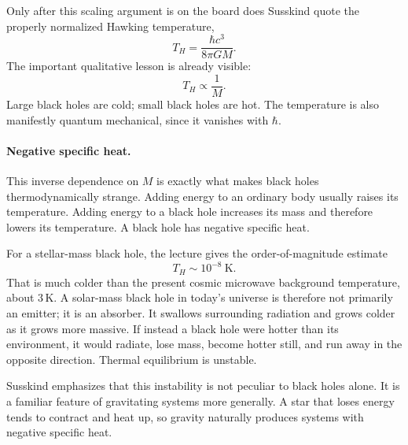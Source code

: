 Only after this scaling argument is on the board does Susskind quote the properly normalized Hawking temperature,
\begin{equation}
T_H = \frac{\hbar c^3}{8\pi GM}.
\end{equation}
The important qualitative lesson is already visible:
\begin{equation}
T_H \propto \frac{1}{M}.
\end{equation}
Large black holes are cold; small black holes are hot. The temperature is also manifestly quantum mechanical, since it vanishes with \(\hbar\).

\paragraph{Negative specific heat.}
This inverse dependence on \(M\) is exactly what makes black holes thermodynamically strange. Adding energy to an ordinary body usually raises its temperature. Adding energy to a black hole increases its mass and therefore lowers its temperature. A black hole has negative specific heat.

For a stellar-mass black hole, the lecture gives the order-of-magnitude estimate
\begin{equation}
T_H \sim 10^{-8}\ \mathrm{K}.
\end{equation}
That is much colder than the present cosmic microwave background temperature, about \(3\,\mathrm{K}\). A solar-mass black hole in today's universe is therefore not primarily an emitter; it is an absorber. It swallows surrounding radiation and grows colder as it grows more massive. If instead a black hole were hotter than its environment, it would radiate, lose mass, become hotter still, and run away in the opposite direction. Thermal equilibrium is unstable.

Susskind emphasizes that this instability is not peculiar to black holes alone. It is a familiar feature of gravitating systems more generally. A star that loses energy tends to contract and heat up, so gravity naturally produces systems with negative specific heat.

